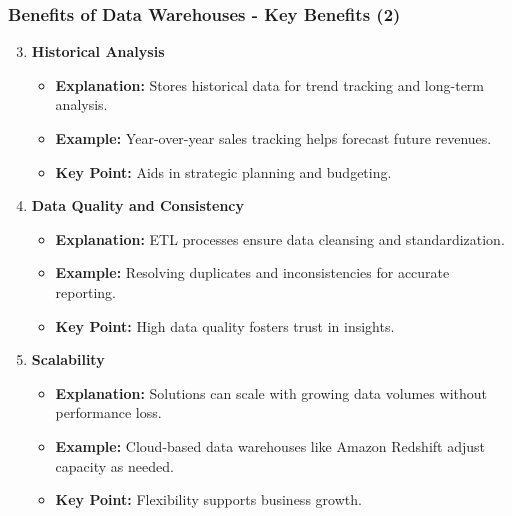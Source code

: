 \documentclass[aspectratio=169]{beamer}
\begin{document}
\begin{frame}[fragile]
    \frametitle{Benefits of Data Warehouses - Key Benefits (2)}
    \begin{enumerate}
        \setcounter{enumi}{2}
        \item \textbf{Historical Analysis}
            \begin{itemize}
                \item \textbf{Explanation:} Stores historical data for trend tracking and long-term analysis.
                \item \textbf{Example:} Year-over-year sales tracking helps forecast future revenues.
                \item \textbf{Key Point:} Aids in strategic planning and budgeting.
            \end{itemize}

        \item \textbf{Data Quality and Consistency}
            \begin{itemize}
                \item \textbf{Explanation:} ETL processes ensure data cleansing and standardization.
                \item \textbf{Example:} Resolving duplicates and inconsistencies for accurate reporting.
                \item \textbf{Key Point:} High data quality fosters trust in insights.
            \end{itemize}
            
        \item \textbf{Scalability}
            \begin{itemize}
                \item \textbf{Explanation:} Solutions can scale with growing data volumes without performance loss.
                \item \textbf{Example:} Cloud-based data warehouses like Amazon Redshift adjust capacity as needed.
                \item \textbf{Key Point:} Flexibility supports business growth.
            \end{itemize}
    \end{enumerate}
\end{frame}
\end{document}
